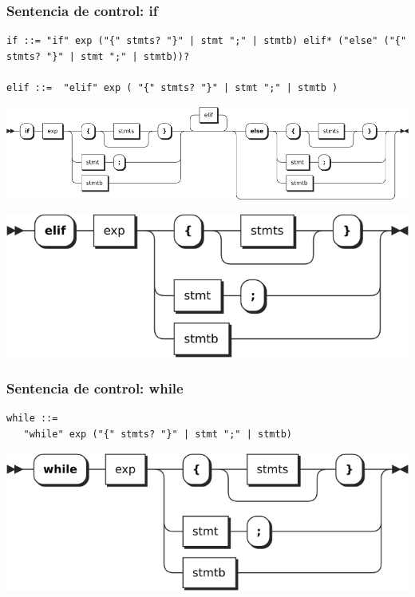 \subsubsection{Sentencia de control: if}
\begin{lstlisting}[style=nonumbers,
    basicstyle=\tiny, %or \small or \footnotesize etc.
]
if ::= "if" exp ("{" stmts? "}" | stmt ";" | stmtb) elif* ("else" ("{" stmts? "}" | stmt ";" | stmtb))?

elif ::=  "elif" exp ( "{" stmts? "}" | stmt ";" | stmtb ) 
\end{lstlisting}  	
\begin{center}
\includegraphics[scale=0.5]{diagram/if.png} \\
\end{center}
\begin{center}
\includegraphics[scale=0.5]{diagram/elif.png} \\
\end{center}

\subsubsection{Sentencia de control: while}
\begin{multicols}{2}
\begin{lstlisting}[style=nonumbers,
    basicstyle=\tiny]
while ::= 
   "while" exp ("{" stmts? "}" | stmt ";" | stmtb)
\end{lstlisting}  	
\columnbreak
\begin{center}
\includegraphics[scale=0.5]{diagram/while.png} \\
\end{center}
\end{multicols}

